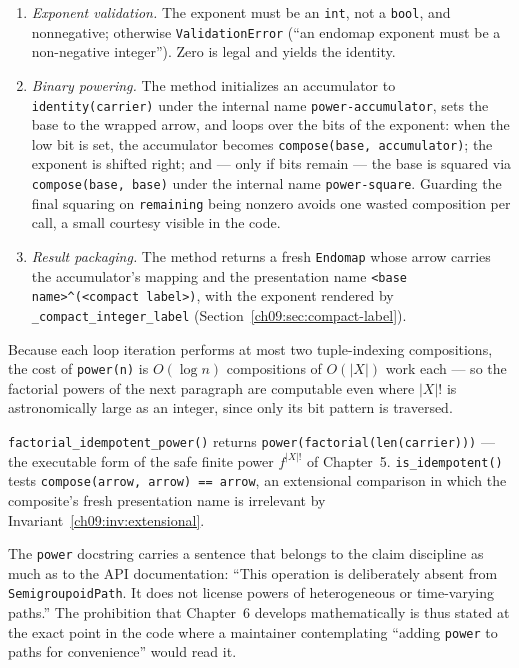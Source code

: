 \begin{enumerate}
\item \emph{Exponent validation.} The exponent must be an \texttt{int},
      not a \texttt{bool}, and nonnegative; otherwise
      \texttt{ValidationError} (``an endomap exponent must be a
      non-negative integer''). Zero is legal and yields the identity.
\item \emph{Binary powering.} The method initializes an accumulator to
      \texttt{identity(carrier)} under the internal name
      \texttt{power-accumulator}, sets the base to the wrapped arrow, and
      loops over the bits of the exponent: when the low bit is set, the
      accumulator becomes \texttt{compose(base, accumulator)}; the exponent
      is shifted right; and --- only if bits remain --- the base is squared
      via \texttt{compose(base, base)} under the internal name
      \texttt{power-square}. Guarding the final squaring on
      \texttt{remaining} being nonzero avoids one wasted composition per
      call, a small courtesy visible in the code.
\item \emph{Result packaging.} The method returns a fresh
      \texttt{Endomap} whose arrow carries the accumulator's mapping and
      the presentation name
      \texttt{<base name>\^{}(<compact label>)}, with the exponent rendered
      by \texttt{\_compact\_integer\_label}
      (Section~\ref{ch09:sec:compact-label}).
\end{enumerate}

Because each loop iteration performs at most two tuple-indexing
compositions, the cost of \texttt{power(n)} is $O(\log n)$ compositions of
$O(|X|)$ work each --- so the factorial powers of the next paragraph are
computable even where $|X|!$ is astronomically large as an integer, since
only its bit pattern is traversed.

\texttt{factorial\_idempotent\_power()} returns
\texttt{power(factorial(len(carrier)))} --- the executable form of the safe
finite power $f^{|X|!}$ of Chapter~5. \texttt{is\_idempotent()} tests
\texttt{compose(arrow, arrow) == arrow}, an extensional comparison in which
the composite's fresh presentation name is irrelevant by
Invariant~\ref{ch09:inv:extensional}.

\begin{remark}\label{ch09:rem:power-docstring}
The \texttt{power} docstring carries a sentence that belongs to the claim
discipline as much as to the API documentation: ``This operation is
deliberately absent from \texttt{SemigroupoidPath}. It does not license
powers of heterogeneous or time-varying paths.'' The prohibition that
Chapter~6 develops mathematically is thus stated at the exact point in the
code where a maintainer contemplating ``adding \texttt{power} to paths for
convenience'' would read it.
\end{remark}

